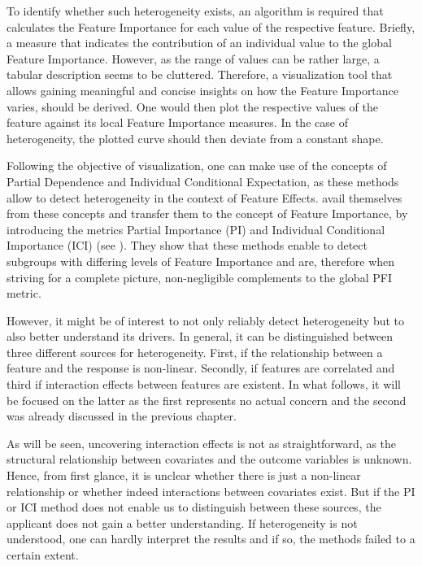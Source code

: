 \documentclass[
]{krantz}
\begin{document}
To identify whether such heterogeneity exists, an algorithm is required that calculates the Feature Importance for each value of the respective feature. Briefly, a measure that indicates the contribution of an individual value to the global Feature Importance. However, as the range of values can be rather large, a tabular description seems to be cluttered. Therefore, a visualization tool that allows gaining meaningful and concise insights on how the Feature Importance varies, should be derived. One would then plot the respective values of the feature against its local Feature Importance measures. In the case of heterogeneity, the plotted curve should then deviate from a constant shape.

Following the objective of visualization, one can make use of the concepts of Partial Dependence and Individual Conditional Expectation, as these methods allow to detect heterogeneity in the context of Feature Effects. \citet{casalicchio2018visualizing} avail themselves from these concepts and transfer them to the concept of Feature Importance, by introducing the metrics Partial Importance (PI) and Individual Conditional Importance (ICI) (see \citet{Goldstein2013}). They show that these methods enable to detect subgroups with differing levels of Feature Importance and are, therefore when striving for a complete picture, non-negligible complements to the global PFI metric.

However, it might be of interest to not only reliably detect heterogeneity but to also better understand its drivers. In general, it can be distinguished between three different sources for heterogeneity. First, if the relationship between a feature and the response is non-linear. Secondly, if features are correlated and third if interaction effects between features are existent. In what follows, it will be focused on the latter as the first represents no actual concern and the second was already discussed in the previous chapter.

As will be seen, uncovering interaction effects is not as straightforward, as the structural relationship between covariates and the outcome variables is unknown. Hence, from first glance, it is unclear whether there is just a non-linear relationship or whether indeed interactions between covariates exist. But if the PI or ICI method does not enable us to distinguish between these sources, the applicant does not gain a better understanding. If heterogeneity is not understood, one can hardly interpret the results and if so, the methods failed to a certain extent.
\end{document}
